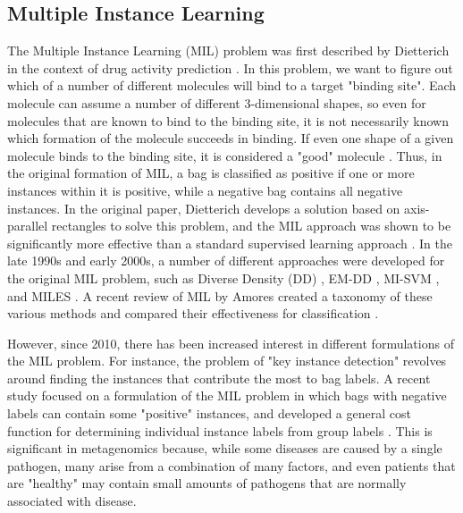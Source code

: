 
\subsection{Multiple Instance Learning}

The Multiple Instance Learning (MIL) problem was first described by Dietterich in the context of drug activity prediction \cite{dietterich97}. In this problem, we want to figure out which of a number of different molecules will bind to a target "binding site". Each molecule can assume a number of different 3-dimensional shapes, so even for molecules that are known to bind to the binding site, it is not necessarily known which formation of the molecule succeeds in binding. If even one shape of a given molecule binds to the binding site, it is considered a "good" molecule \cite{dietterich97}. Thus, in the original formation of MIL, a bag is classified as positive if one or more instances within it is positive, while a negative bag contains all negative instances. In the original paper, Dietterich develops a solution based on axis-parallel rectangles to solve this problem, and the MIL approach was shown to be significantly more effective than a standard supervised learning approach \cite{dietterich97}. In the late 1990s and early 2000s, a number of different approaches were developed for the original MIL problem, such as Diverse Density (DD) \cite{perez98}, EM-DD \cite{zhang01}, MI-SVM \cite{andrews02}, and MILES \cite{wang06}. A recent review of MIL by Amores created a taxonomy of these various methods and compared their effectiveness for classification \cite{amores13}.
%

However, since 2010, there has been increased interest in different formulations of the MIL problem. For instance, the problem of "key instance detection" \cite{zhou12} revolves around finding the instances that contribute the most to bag labels. A recent study focused on a formulation of the MIL problem in which bags with negative labels can contain some "positive" instances, and developed a general cost function for determining individual instance labels from group labels \cite{kotzias15}. This is significant in metagenomics because, while some diseases are caused by a single pathogen, many arise from a combination of many factors, and even patients that are "healthy" may contain small amounts of pathogens that are normally associated with disease. 
%

